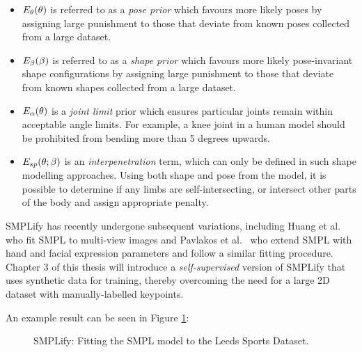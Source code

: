     \begin{itemize}
        \item $E_{\theta}(\theta)$ is referred to as a \textit{pose prior} which favours more likely poses by assigning large punishment to those that deviate from known poses collected from a large dataset.
        \item $E_{\beta}(\beta)$ is referred to as a \textit{shape prior} which favours more likely pose-invariant shape configurations by assigning large punishment to those that deviate from known shapes collected from a large dataset. 
        \item $E_{\alpha}(\theta)$ is a \textit{joint limit} prior which ensures particular joints remain within acceptable angle limits. For example, a knee joint in a human model should be prohibited from bending more than 5 degrees upwards.
        \item $E_{sp}(\theta; \beta)$ is an \textit{interpenetration} term, which can only be defined in such shape modelling approaches. Using both shape and pose from the model, it is possible to determine if any limbs are self-intersecting, or intersect other parts of the body and assign appropriate penalty.
    \end{itemize}

    SMPLify has recently undergone subsequent variations, including Huang et al.~ who fit SMPL to multi-view images and Pavlakos et al.~ who extend SMPL with hand and facial expression parameters and follow a similar fitting procedure. Chapter 3 of this thesis will introduce a \emph{self-supervised} version of SMPLify that uses synthetic data for training, thereby overcoming the need for a large 2D dataset with manually-labelled keypoints.

    An example result can be seen in Figure \ref{fig:smplify}:

    \begin{figure}[H] %
        \caption{SMPLify: Fitting the SMPL model to the Leeds Sports Dataset.}
        \label{fig:smplify}
    \end{figure}
        
